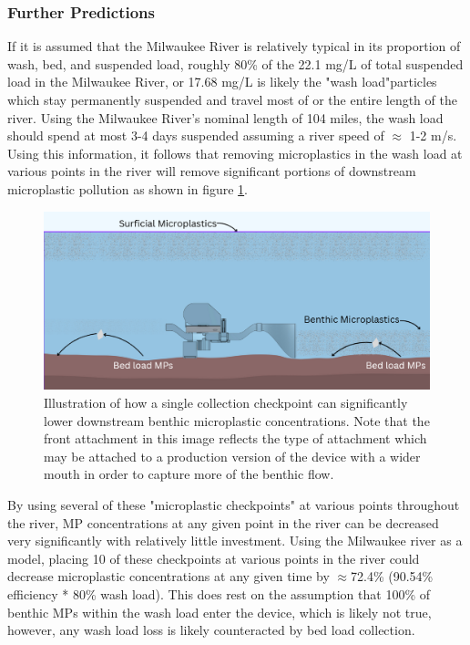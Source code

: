 \documentclass[fleqn,10pt]{SelfArx} %
\begin{document}
	\subsubsection{Further Predictions}	
	If it is assumed that the Milwaukee River is relatively typical in its proportion of wash, bed, and suspended load, roughly 80\% of the 22.1 mg/L of total suspended load in the Milwaukee River, or 17.68 mg/L is likely the "wash load"\textemdash particles which stay permanently suspended and travel most of or the entire length of the river. Using the Milwaukee River's nominal length of 104 miles, the wash load should spend at most 3-4 days suspended assuming a river speed of $\approx$ 1-2 m/s. 
	\linebreak
	Using this information, it follows that removing microplastics in the wash load at various points in the river will remove significant portions of downstream microplastic pollution as shown in figure \ref{fig:washload}.
	\begin{figure}[h]
		\centering
		\includegraphics[width=1\linewidth]{Figures/WashLoadCollection}
		\caption[Wash Load MP Collection]{Illustration of how a single collection checkpoint can significantly lower downstream benthic microplastic concentrations. Note that the front attachment in this image reflects the type of attachment which may be attached to a production version of the device with a wider mouth in order to capture more of the benthic flow.}
		\label{fig:washload}
	\end{figure}
	By using several of these "microplastic checkpoints" at various points throughout the river, MP concentrations at any given point in the river can be decreased very significantly with relatively little investment. Using the Milwaukee river as a model, placing 10 of these checkpoints at various points in the river could decrease microplastic concentrations at any given time by $\approx$72.4\% (90.54\% efficiency * 80\% wash load). This does rest on the assumption that 100\% of benthic MPs within the wash load enter the device, which is likely not true, however, any wash load loss is likely counteracted by bed load collection. 
	
\end{document}
